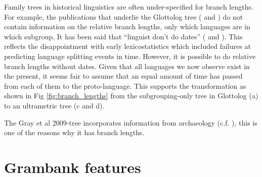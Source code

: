 \documentclass[draft,10pt]{article} %
\begin{document}
Family trees in historical linguistics are often under-specified for branch lengths. For example, the publications that underlie the Glottolog tree (\citet{blust_2009, blust_2014} and \citet{blust_chen_2017}) do not contain information on the relative branch lengths, only which languages are in which subgroup. It has been said that ``linguist don't do dates'' (\citet{mcmahon2006linguists} and \citet{gray2011language}). This reflects the disappointment with early lexicostatistics which included failures at predicting language splitting events in time. However, it is possible to do relative branch lengths without dates. Given that all languages we now observe exist in the present, it seems fair to assume that an equal amount of time has passed from each of them to the proto-language. This supports the transformation as shown in Fig \ref{fig:branch_lengths} from the subgrouping-only tree in Glottolog (a) to an ultrametric tree (c and d).

The Gray et al 2009-tree incorporates information from archaeology (c.f. \citet[92]{lynchrosscrowleyinternalsubgroupingoceanic}), this is one of the reasons why it has branch lengths.


\section{Grambank features}
\label{Grambank_features}
\end{document}
